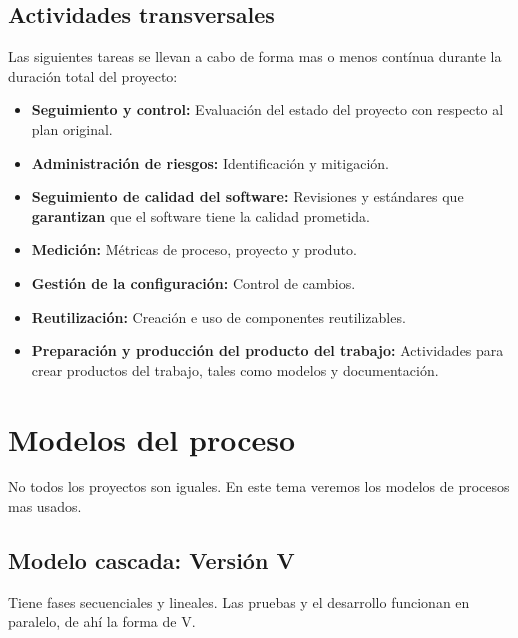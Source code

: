 \documentclass[a4paper,11pt]{report}
\begin{document}
\subsection{Actividades transversales}
Las siguientes tareas se llevan a cabo de forma mas o menos contínua durante la duración total del proyecto:
\begin{itemize}
    \item \textbf{Seguimiento y control:} Evaluación del estado del proyecto con respecto al plan original.

    \item \textbf{Administración de riesgos:} Identificación y mitigación.

    \item \textbf{Seguimiento de calidad del software:} Revisiones y estándares que \textbf{garantizan} que el software tiene la calidad prometida.


    \item \textbf{Medición:} Métricas de proceso, proyecto y produto.

    \item \textbf{Gestión de la configuración:} Control de cambios.

    \item \textbf{Reutilización:} Creación e uso de componentes reutilizables.
    \item \textbf{Preparación y producción del producto del trabajo:} Actividades  para crear productos del trabajo, tales como modelos y documentación.

\end{itemize}

\section{Modelos del proceso}

No todos los proyectos son iguales.
En este tema veremos los modelos de procesos mas usados.

\clearpage
\subsection{Modelo cascada: Versión V}

Tiene fases secuenciales y lineales.
Las pruebas y el desarrollo funcionan en paralelo, de ahí la forma de V.
\end{document}
